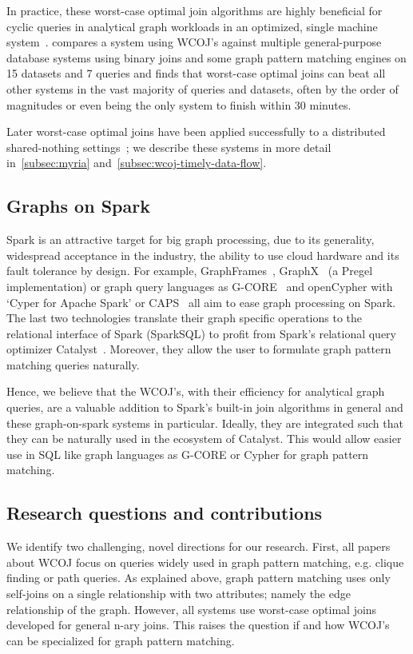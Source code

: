 In practice, these worst-case optimal join algorithms are highly beneficial for cyclic queries in analytical graph
workloads in an optimized, single machine system~\cite{lftj,olddog}.
\cite{olddog} compares a system using \textsc{WCOJ}'s against multiple general-purpose database
systems using binary joins and some graph pattern matching engines on 15 datasets and 7 queries and
finds that worst-case optimal joins can beat all other systems in the vast majority of queries
and datasets, often by the order of magnitudes or even being the only system to finish within 30 minutes.

Later worst-case optimal joins have been applied successfully to a distributed shared-nothing settings~\cite{myria-detailed,
ammar2018distributed};
we describe these systems in more detail in~\cref{subsec:myria} and~\ref{subsec:wcoj-timely-data-flow}.

\subsection{Graphs on Spark}\label{subsec:graphs-on-spark}
Spark is an attractive target for big graph processing, due to its generality, widespread acceptance in the industry, the ability to use
cloud hardware and its fault tolerance by design.
For example, GraphFrames~\cite{graphframe}, GraphX~\cite{graphx} (a Pregel~\cite{pregel} implementation) or graph query languages
as \mbox{G-CORE}~\cite{gcore} and \mbox{openCypher} with `Cyper for Apache Spark' or \textsc{CAPS}~\cite{caps} all aim to ease graph
processing on Spark.
The last two technologies translate their graph specific operations to the relational interface of Spark (SparkSQL)
to profit from Spark's relational query optimizer Catalyst~\cite{spark-sql}.
Moreover, they allow the user to formulate graph pattern matching queries naturally.

Hence, we believe that the WCOJ's, with their efficiency for analytical graph queries, are a valuable addition to Spark's
built-in join algorithms in general and these graph-on-spark systems in particular.
Ideally, they are integrated such that they can be naturally used in the ecosystem of Catalyst.
This would allow easier use in SQL like graph languages as \textsc{G-CORE} or Cypher for graph pattern matching.

\subsection{Research questions and contributions}\label{subsec:research-questions-and-contributions}
We identify two challenging, novel directions for our research.
First, all papers about \textsc{WCOJ} focus on queries widely used in graph pattern matching, e.g. clique finding or path queries.
As explained above, graph pattern matching uses only self-joins on a single relationship with two attributes;
namely the edge relationship of the graph.
However, all systems use worst-case optimal joins developed for general n-ary joins.
This raises the question if and how \textsc{WCOJ}'s can be specialized for graph pattern matching.

